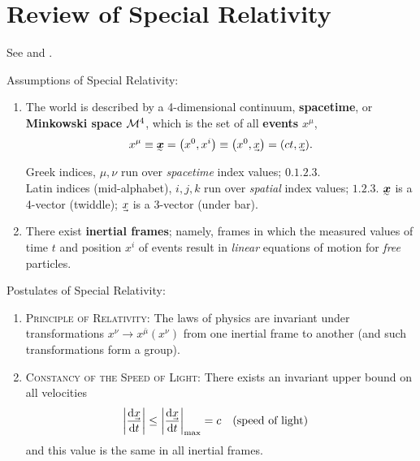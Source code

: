\chapter[Review of Special Relativity]{Review of Special Relativity}

\begin{note}[Background]
See \cite[ch~1]{schutz2009first} and \cite[ch 5, 12, 13]{doughty2018lagrangian}.
\end{note}

\noindent
Assumptions of Special Relativity:
\begin{enumerate}
	\item The world is described by a 4-dimensional continuum, \textbf{spacetime}, or \textbf{Minkowski space} $\mathcal M^4$, which is the set of all \textbf{events} $x^\mu$,
	\begin{align}
		x^\mu \equiv \ts x = \qty(x^0, x^i) \equiv \qty(x^0, \uvec x) = \qty(ct, \uvec x)
	.\end{align}
	\begin{note}[Notation]
	Greek indices, $\mu,\nu$ run over \textit{spacetime} index values; $\qty{0,1,2,3}$. \\
	Latin indices (mid-alphabet), $i,j,k$ run over \textit{spatial} index values; $\qty{1,2,3}$.
	$\ts x$ is a 4-vector (twiddle); $\uvec x$ is a 3-vector (under bar).
	\end{note}
	
	\item There exist \textbf{inertial frames}; namely, frames in which the measured values of time $t$ and position $x^i$ of events result in \textit{linear} equations of motion for \textit{free} particles.
\end{enumerate}


\noindent
Postulates of Special Relativity:
\begin{enumerate}
	\item \textsc{Principle of Relativity:}
	The laws of physics are invariant under transformations $x^\nu \to x^{\bar\mu}(x^\nu)$ from one inertial frame to another (and such transformations form a group).
	
	\item \textsc{Constancy of the Speed of Light:} There exists an invariant upper bound on all velocities
	\begin{align}
		\qty|\dv{\uvec x}{t}| \le \qty|\dv{\uvec x}{t}|_\text{max} = c
		\qqtext{(speed of light)}
	\end{align}
	and this value is the same in all inertial frames.
\end{enumerate}
	
